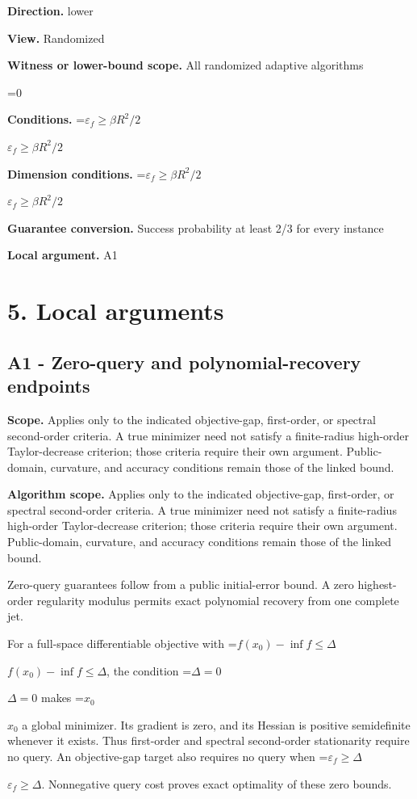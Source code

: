 \documentclass[10pt,a4paper]{article}
\newcommand{\AtlasMath}[1]{\par\begingroup\centering\setbox0=\hbox{$\displaystyle #1$}\ifdim\wd0>1.4\linewidth\typeout{ATLAS WIDE FORMULA: \the\wd0}\fi\ifdim\wd0>\linewidth\resizebox{\linewidth}{!}{\box0}\else\box0\fi\par\endgroup}
\newcommand{\AtlasInlineMath}[1]{\begingroup\setbox0=\hbox{$#1$}\ifdim\wd0>.4\linewidth\endgroup\AtlasMath{#1}\else\endgroup$#1$\fi}
\begin{document}
\textbf{Direction.} lower

\textbf{View.} Randomized

\textbf{Witness or lower-bound scope.} All randomized adaptive algorithms

\AtlasMath{0}
\textbf{Conditions.} \AtlasInlineMath{\varepsilon_f\ge\beta R^2/2}

\textbf{Dimension conditions.} \AtlasInlineMath{\varepsilon_f\ge\beta R^2/2}

\textbf{Guarantee conversion.} Success probability at least 2/3 for every instance

\textbf{Local argument.} A1

\section{5. Local arguments}
\subsection{A1 - Zero-query and polynomial-recovery endpoints}
\textbf{Scope.} Applies only to the indicated objective-gap, first-order, or spectral second-order criteria. A true minimizer need not satisfy a finite-radius high-order Taylor-decrease criterion; those criteria require their own argument. Public-domain, curvature, and accuracy conditions remain those of the linked bound.

\textbf{Algorithm scope.} Applies only to the indicated objective-gap, first-order, or spectral second-order criteria. A true minimizer need not satisfy a finite-radius high-order Taylor-decrease criterion; those criteria require their own argument. Public-domain, curvature, and accuracy conditions remain those of the linked bound.

Zero-query guarantees follow from a public initial-error bound. A zero highest-order regularity modulus permits exact polynomial recovery from one complete jet.

For a full-space differentiable objective with \AtlasInlineMath{f(x_0)-\inf f\le\Delta}, the condition \AtlasInlineMath{\Delta=0} makes \AtlasInlineMath{x_0} a global minimizer. Its gradient is zero, and its Hessian is positive semidefinite whenever it exists. Thus first-order and spectral second-order stationarity require no query. An objective-gap target also requires no query when \AtlasInlineMath{\varepsilon_f\ge\Delta}. Nonnegative query cost proves exact optimality of these zero bounds.
\end{document}
